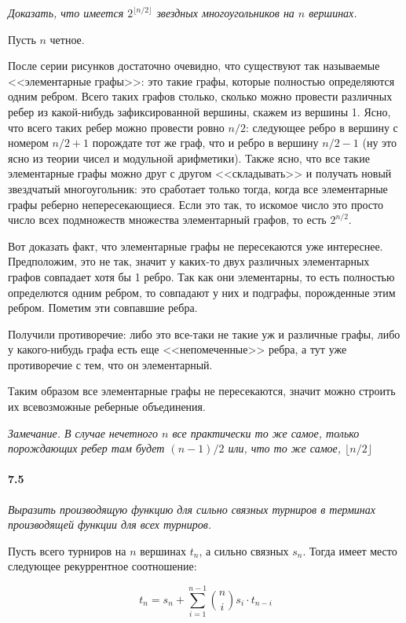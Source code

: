 \documentclass[russian]{article}
\begin{document}
\textit{Доказать, что имеется $2^{\lfloor n/2 \rfloor}$ звездных многоугольников на $n$ вершинах.}

Пусть $n$ четное.

После серии рисунков достаточно очевидно, что существуют так называемые <<элементарные графы>>: это такие графы, которые полностью определяются одним ребром. Всего таких графов столько, сколько можно провести различных ребер из какой-нибудь зафиксированной вершины, скажем из вершины 1. Ясно, что всего таких ребер можно провести ровно $n/2$: следующее ребро в вершину с номером $n/2 + 1$ порождате тот же граф, что и ребро в вершину $n/2 - 1$ (ну это ясно из теории чисел и модульной арифметики). Также ясно, что все такие элементарные графы можно друг с другом <<складывать>> и получать новый звездчатый многоугольник: это сработает только тогда, когда все элементарные графы реберно непересекающиеся. Если это так, то искомое число это просто число всех подмножеств множества элементарный графов, то есть $2^{n/2}$.

Вот доказать факт, что элементарные графы не пересекаются уже интереснее. Предположим, это не так, значит у каких-то двух различных элементарных графов совпадает хотя бы 1 ребро. Так как они элементарны, то есть полностью определются одним ребром, то совпадают у них и подграфы, порожденные этим ребром. Пометим эти совпавшие ребра. 

Получили противоречие: либо это все-таки не такие уж и различные графы, либо у какого-нибудь графа есть еще <<непомеченные>> ребра, а тут уже противоречие с тем, что он элементарный.

Таким образом все элементарные графы не пересекаются, значит можно строить их всевозможные реберные объединения.

\textit{Замечание. В случае нечетного $n$ все практически то же самое, только порождающих ребер там будет $(n-1)/2$ или, что то же самое, $\lfloor n/2 \rfloor$}

\paragraph*{7.5}

\textit{Выразить производящую функцию для сильно связных турниров в терминах производящей функции для всех турниров.}

Пусть всего турниров на $n$ вершинах $t_n$, а сильно связных $s_n$. Тогда имеет место следующее рекуррентное соотношение:

\[
t_n = s_n + \sum_{i=1}^{n-1} \binom{n}{i} s_i \cdot t_{n-i} 
\]
\end{document}
